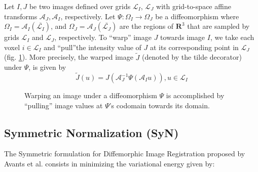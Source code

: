 Let $I, J$ be two images defined over grids $\mathcal{L}_{I}$, $\mathcal{L}_{J}$ with grid-to-space affine transforms $\mathcal{A}_{J}, \mathcal{A}_{I}$, respectively. Let
$\Psi:\Omega_{I} \rightarrow \Omega_{J}$ be a diffeomorphism where $\Omega_{I} = \mathcal{A}_{I}(\bar{\mathcal{L}_{I}})$,
and $\Omega_{J} = \mathcal{A}_{J}(\bar{\mathcal{L}_{J}})$ are the regions of $\mathbf{R}^{3}$ that are sampled by grids $\mathcal{L}_{I}$ and $\mathcal{L}_{J}$, respectively.
To ``warp'' image $J$ towards image $I$, we take each voxel $i \in \mathcal{L}_{I}$ and ``pull''the intensity value of $J$ at its corresponding point in $\mathcal{L}_{J}$
(fig. \ref{fig:pull_back}). More precisely, the warped image $\tilde{J}$ (denoted by the tilde decorator) under $\Psi$, is given by
\begin{equation}\label{eq:warp_definition}
    \tilde{J}(u) = J(\mathcal{A}_{J}^{-1}\Psi(\mathcal{A}_{I}u)), u \in \mathcal{L}_{I}
\end{equation}

\begin{figure}[H]
\centering
{}
\caption{Warping an image under a diffeomorphism $\Psi$ is accomplished by ``pulling'' image values at $\Psi$'s codomain towards its domain.}
\label{fig:pull_back}
\end{figure}

\subsection{Symmetric Normalization (SyN)}
The Symmetric formulation for Diffemorphic Image Registration proposed by Avants et al. \cite{Avants2009} consists in minimizing the variational energy given by:

